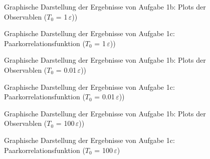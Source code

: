 \begin{landscape}
	\begin{figure}
		\caption{Graphische Darstellung der Ergebnisse von Aufgabe 1b: Plots der Observablen ($T_0$ = 1$\,\varepsilon$))}
		\label{fig:observablen1}
	\end{figure}
\end{landscape} 


\begin{landscape}
	\begin{figure}
		\caption{Graphische Darstellung der Ergebnisse von Aufgabe 1c: Paarkorrelationsfunktion ($T_0$ = 1$\,\varepsilon$))}
		\label{fig:paarb1}
	\end{figure}
\end{landscape} 

\begin{landscape}
	\begin{figure}
		\caption{Graphische Darstellung der Ergebnisse von Aufgabe 1b: Plots der Observablen ($T_0$ = 0.01$\,\varepsilon$))}
		\label{fig:observablen2}
	\end{figure}
\end{landscape} 


\begin{landscape}
	\begin{figure}
		\caption{Graphische Darstellung der Ergebnisse von Aufgabe 1c: Paarkorrelationsfunktion ($T_0$ = 0.01$\,\varepsilon$))}
		\label{fig:paarb2}
	\end{figure}
\end{landscape} 

\begin{landscape}
	\begin{figure}
		\caption{Graphische Darstellung der Ergebnisse von Aufgabe 1b: Plots der Observablen ($T_0$ = 100$\,\varepsilon$))}
		\label{fig:observablen3}
	\end{figure}
\end{landscape} 


\begin{landscape}
	\begin{figure}
		\caption{Graphische Darstellung der Ergebnisse von Aufgabe 1c: Paarkorrelationsfunktion ($T_0$ = 100$\,\varepsilon$)}
		\label{fig:paarb3}
	\end{figure}
\end{landscape} 

